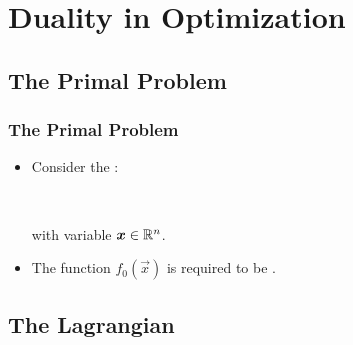 \section{Duality in Optimization}

\subsection{The Primal Problem}

\begin{frame}
  \frametitle{The Primal Problem}
 
  \begin{itemize}
    \item Consider the : \\[.4cm]
      \begin{center}
        \\[.4cm]
      \end{center}
      with variable ${\bm x}\in\mathbb{R}^n$. \\[.5cm]
    \item The function $f_0(\vec{x})$ is  required to be .
  \end{itemize}
\end{frame}


\subsection{The Lagrangian}

